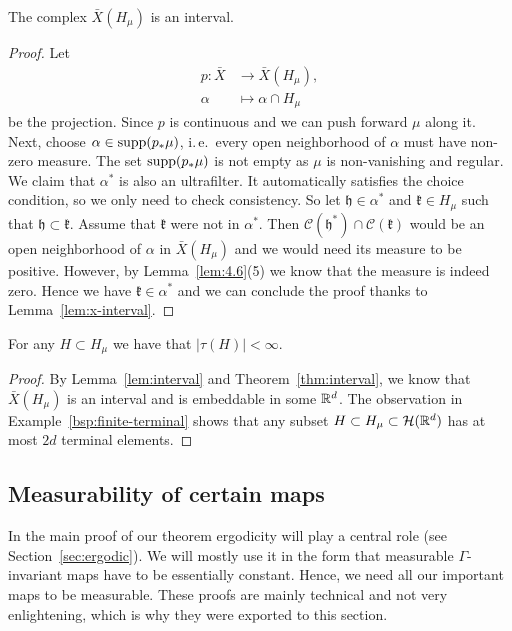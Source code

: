 \begin{lemma}[{\cite[Lemma 4.7]{MR3509968}}]
  \label{lem:interval}
  The complex \(\bar X(H_\mu)\) is an interval.
\end{lemma}

\begin{proof}
  Let
  \begin{align*}
    p \colon \bar X &\to \bar X (H_\mu),\\
    \alpha &\mapsto \alpha \cap H_\mu
  \end{align*}
  be the projection. Since \(p\) is continuous and we can push forward \(\mu\) along it. Next, choose \(\alpha \in \operatorname{supp}(p_\ast \mu)\), i.\,e.\ every open neighborhood of \(\alpha\) must have non-zero measure. The set \(\operatorname{supp}(p_\ast \mu)\) is not empty as \(\mu\) is non-vanishing and regular. We claim that \(\alpha^\ast\) is also an ultrafilter. It automatically satisfies the choice condition, so we only need to check consistency. So let \(\mathfrak{h} \in \alpha^\ast\) and \(\mathfrak{k} \in H_\mu\) such that \(\mathfrak{h} \subset \mathfrak{k}\). Assume that \(\mathfrak{k}\) were not in \(\alpha^\ast\). Then \(\mathcal{C}(\mathfrak{h^\ast}) \cap \mathcal{C}(\mathfrak{k})\) would be an open neighborhood of \(\alpha\) in \(\bar X(H_\mu)\) and we would need its measure to be positive. However, by Lemma~\ref{lem:4.6}(5) we know that the measure is indeed zero. Hence we have \(\mathfrak{k} \in \alpha^\ast\) and we can conclude the proof thanks to Lemma~\ref{lem:x-interval}.
\end{proof}

\begin{lemma}
  \label{lem:finite-terminal}
  For any \(H \subset H_\mu\) we have that \(|\tau(H)| < \infty\).
\end{lemma}

\begin{proof}
  By Lemma~\ref{lem:interval} and Theorem~\ref{thm:interval}, we know that \(\bar X(H_\mu)\) is an interval and is embeddable in some \(\mathbb{R}^d\). The observation in Example~\ref{bsp:finite-terminal} shows that any subset \(H \subset H_\mu \subset \mathcal{H}(\mathbb{R}^d)\) has at most \(2d\) terminal elements.
\end{proof}

\subsection{Measurability of certain maps}
\label{sec:meas-maps}

In the main proof of our theorem ergodicity will play a central role (see Section~\ref{sec:ergodic}). We will mostly use it in the form that measurable \(\Gamma\)-invariant maps have to be essentially constant. Hence, we need all our important maps to be measurable. These proofs are mainly technical and not very enlightening, which is why they were exported to this section.

